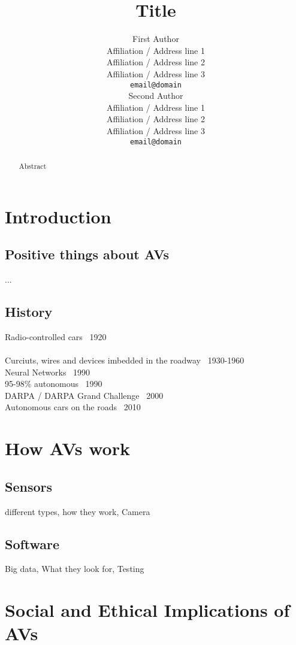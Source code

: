 \documentclass[11pt]{article}
\title{Title}
\author{First Author \\
  Affiliation / Address line 1 \\
  Affiliation / Address line 2 \\
  Affiliation / Address line 3 \\
  {\tt email@domain} \\\And
  Second Author \\
  Affiliation / Address line 1 \\
  Affiliation / Address line 2 \\
  Affiliation / Address line 3 \\
  {\tt email@domain} \\}
\date{}
\begin{document}
\maketitle
\begin{abstract}
Abstract
\end{abstract}

\section{Introduction}
\subsection{Positive things about AVs}
...
\subsection{History}
Radio-controlled cars ~1920\\
\cite{The Milwaukee Sentinel:26}\\
Curciuts, wires and devices imbedded in the roadway ~1930-1960\\
Neural Networks ~1990\\
95-98\% autonomous ~1990\\
DARPA / DARPA Grand Challenge ~2000\\
Autonomous cars on the roads ~2010\\
\cite{eWeek:14}

\section{How AVs work}
\subsection{Sensors}
different types, how they work, Camera 

\subsection{Software}
Big data, What they look for, Testing

\section{Social and Ethical Implications of AVs}
\end{document}
